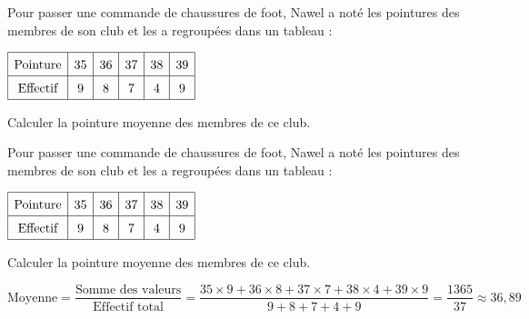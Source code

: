 \begin{exercice*}[Pointures]
    Pour passer une commande de chaussures de foot, Nawel a noté les pointures des membres de son club et les a regroupées dans un tableau :

    \medskip
    $\def\arraystretch{1.5}\begin{array}{|c|c|c|c|c|c|} \hline \text{Pointure} & 35 & 36 & 37 & 38 & 39 \\
     \hline \text{Effectif} & 9 & 8 & 7 & 4 & 9 \\
    \hline \end{array}$
    
    \medskip
    Calculer la pointure moyenne des membres de ce club.

\end{exercice*}
\begin{corrige}
    Pour passer une commande de chaussures de foot, Nawel a noté les pointures des membres de son club et les a regroupées dans un tableau :

\medskip
$\def\arraystretch{1.5}\begin{array}{|c|c|c|c|c|c|} \hline \text{Pointure} & 35 & 36 & 37 & 38 & 39 \\
 \hline \text{Effectif} & 9 & 8 & 7 & 4 & 9 \\
\hline \end{array}$

\medskip
Calculer la pointure moyenne des membres de ce club.

    {\red
    \begin{spacing}{1.5}
        $\text{Moyenne} = \dfrac{\text{Somme des valeurs}}{\text{Effectif total}} =\dfrac{35 \times 9+ 36 \times 8+ 37 \times 7+ 38 \times 4+ 39 \times 9}{9+ 8+ 7+ 4+ 9} = \dfrac{1365}{37} \approx36{,}89$\\
    \end{spacing}
    }
\end{corrige}

